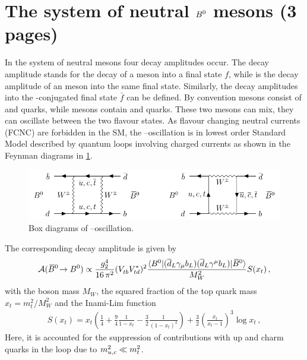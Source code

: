 
\section{The system of neutral \texorpdfstring{${{B}^0}$}{B0} mesons (3 pages)}
\label{sec:cpviolation:neutralBmesons}

In the system of neutral \Bd mesons four decay amplitudes occur. The decay
amplitude \Af stands for the decay of a \Bd meson into a final state $f$, while
\Abarf is the decay amplitude of an \Bdb meson into the same final state.
Similarly, the decay amplitudes into the \CP-conjugated final state $\bar{f}$
can be defined. By convention \Bd mesons consist of \bquarkbar and \dquark
quarks, while \Bdb mesons contain \bquark and \dquarkbar quarks. These two
mesons can mix, \ie they can oscillate between the two flavour states. As
flavour changing neutral currents (FCNC) are forbidden in the SM, the
\Bd--\Bdb oscillation is in lowest order Standard Model described by quantum
loops involving charged currents as shown in the Feynman diagrams in
\cref{fig:cpviolation:neutralBmesons:boxdiagram}.
\begin{figure}[htb]
\centering
\includegraphics[width=\textwidth]{03-CPViolation/tikz/pdf/Boxdiagrams.pdf}
\caption{Box diagrams of \Bd--\Bdb oscillation.}
\label{fig:cpviolation:neutralBmesons:boxdiagram}
\end{figure}
The corresponding decay amplitude is given by
\begin{align}
	\mathcal{A}({{\kern 0.18em\overline{\kern -0.18em B}{}}{}^0}\!\rightarrow{\ensuremath{{B}^0}}) \propto \frac{g_2^4}{16\,\pi^2}({V_{{t}{b}}^{}}{V_{{t}{d}}^\ast})^2 \frac{\langle {\ensuremath{{B}^0}}|({\overline {{d}}}_L\gamma_\mu{\ensuremath{b}}_L)({\overline {{d}}}_L\gamma^\mu{\ensuremath{b}}_L)|{{\kern 0.18em\overline{\kern -0.18em B}{}}{}^0}\rangle}{M_W^2}S(x_t)\,,
\end{align}
with the \W boson mass $M_W$, the squared fraction of the top quark mass $x_t
= m_t^2/M_W^2$ and the Inami-Lim function~\cite{Inami:1980fz}
\begin{align}
	S(x_t) = x_t \left(\frac 14 + \frac 94 \frac{1}{1 - x_t} - \frac 32 \frac{1}{(1 - x_t)^2}\right) + \frac 32 \left(\frac{x_t}{x_t - 1}\right)^3 \log x_t\,,
\end{align}
Here, it is accounted for the suppression of contributions with up and charm quarks
in the loop due to $m_{{u},{c}}^2 \ll m_{{t}}^2$.


